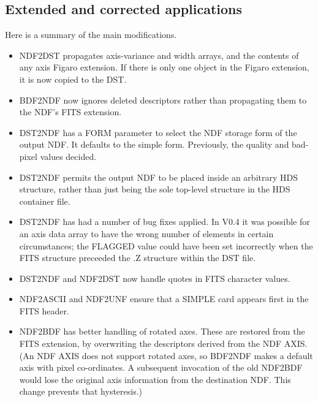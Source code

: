 \subsection{Extended and corrected applications}
  
Here is a summary of the main modifications.
\begin{itemize}
  \item NDF2DST propagates axis-variance and width arrays, and the
        contents of any axis Figaro extension.  If there is only one
        object in the Figaro extension, it is now copied to the DST.

  \item BDF2NDF now ignores deleted descriptors rather than propagating
        them to the NDF's FITS extension.

  \item DST2NDF has a FORM parameter to select the NDF storage form of
        the output NDF.  It defaults to the simple form.  Previously,
        the quality and bad-pixel values decided.

  \item DST2NDF permits the output NDF to be placed inside an arbitrary
        HDS structure, rather than just being the sole top-level
        structure in the HDS container file.

  \item DST2NDF has had a number of bug fixes applied.  In V0.4 it was
        possible for an axis data array to have the wrong number of
        elements in certain circumstances; the FLAGGED value could have
        been set incorrectly when the FITS structure preceeded the .Z
        structure within the DST file.

  \item DST2NDF and NDF2DST now handle quotes in FITS character values.

  \item NDF2ASCII and NDF2UNF ensure that a SIMPLE card appears first in
        the FITS header.

  \item NDF2BDF has better handling of rotated axes.  These are restored
        from the FITS extension, by overwriting the descriptors derived
        from the NDF AXIS.  (An NDF AXIS does not support rotated axes,
        so BDF2NDF makes a default axis with pixel co-ordinates.  A
        subsequent invocation of the old NDF2BDF would lose the original
        axis information from the destination NDF.  This change prevents
        that hysteresis.)


\end{itemize}
